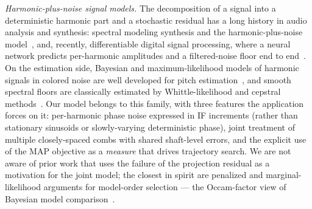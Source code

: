 \documentclass[journal]{IEEEtran}
\begin{document}
\emph{Harmonic-plus-noise signal models.} The decomposition of a signal
into a deterministic harmonic part and a stochastic residual has a long
history in audio analysis and synthesis: spectral modeling synthesis and
the harmonic-plus-noise model~\cite{serra1990sms,stylianou2001hnm}, and,
recently, differentiable digital signal processing, where a neural
network predicts per-harmonic amplitudes and a filtered-noise floor end
to end~\cite{engel2020ddsp}. On the estimation side, Bayesian and
maximum-likelihood models of harmonic signals in colored noise are well
developed for pitch
estimation~\cite{christensen2009multipitch,nielsen2017fastf0}, and
smooth spectral floors are classically estimated by Whittle-likelihood
and cepstral methods~\cite{whittle1953,stoica2006cepstrum}. Our model
belongs to this family, with three features the application forces on
it: per-harmonic phase noise expressed in IF increments (rather than
stationary sinusoids or slowly-varying deterministic phase), joint
treatment of multiple closely-spaced combs with shared shaft-level
errors, and the explicit use of the MAP objective as a \emph{measure}
that drives trajectory search. We are not aware of prior work that uses
the failure of the projection residual as a motivation for the joint
model; the closest in spirit are penalized and marginal-likelihood
arguments for model-order selection --- the Occam-factor
view of Bayesian model comparison~\cite{mackay1992bayesian}.
\end{document}
